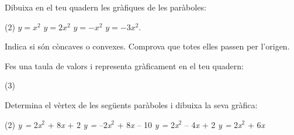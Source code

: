 \begin{mylist}


\exer  Dibuixa en el teu quadern les gràfiques de les paràboles: 
\begin{tasks}(2)
	\task  $y =  \textit{x}^{2}$   
	\task  $y = 2 \textit{x}^{2}$
	\task  $y =\textit{$-$x}^{2}$
	\task  $y = -3\textit{x}^{2}$. 
\end{tasks}
Indica si són còncaves o convexes. Comprova que totes elles passen per l'origen.


\exer  Fes una taula de valors i representa gràficament en el teu quadern: 
\begin{tasks}(3)
\end{tasks}
 
 \exer  Determina el vèrtex de les següents paràboles i dibuixa la seva gràfica:
 
 \begin{tasks}(2)
 	\task  \textit{y =} 2\textit{x}${}^{2}$ + 8\textit{x} + 2                       
 	\task  \textit{y =} --2\textit{x}${}^{2}$ + 8\textit{x} -- 10            
 	\task  \textit{y =} 2\textit{x}${}^{2}$ -- 4\textit{x} + 2  
 	\task  \textit{y =} 2\textit{x}${}^{2}$ + 6\textit{x}
 \end{tasks}


\end{mylist}
